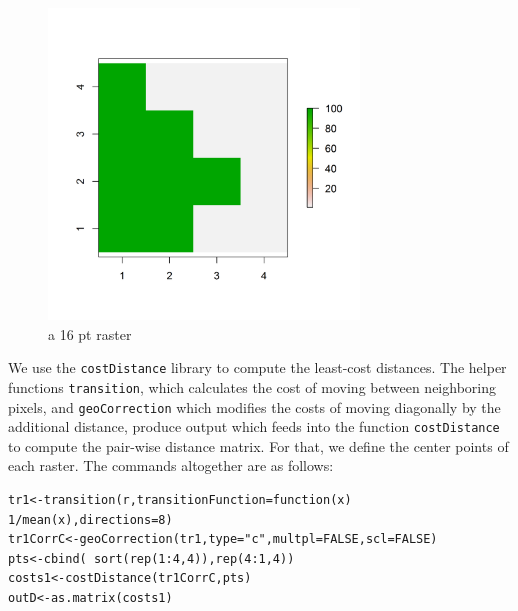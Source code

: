 \documentclass[12pt]{article}
\begin{document}
\begin{figure}
\begin{center}
\includegraphics[height=3.25in,width=3.25in]{figs/raster_2values}
\end{center}
\caption{a 16 pt raster}
\label{ecoldist.fig.raster}
\end{figure}

We use the \mbox{\tt costDistance} library to compute the least-cost
distances.  The helper functions \mbox{\tt transition}, which
calculates the cost of moving between neighboring pixels, and
\mbox{\tt geoCorrection} which modifies the costs of moving diagonally
by the additional distance, produce output which feeds into the
function \mbox{\tt costDistance} to compute the pair-wise distance
matrix. For that, we define the center points of each raster.  The
commands altogether are as follows:

\begin{verbatim}
tr1<-transition(r,transitionFunction=function(x) 1/mean(x),directions=8)
tr1CorrC<-geoCorrection(tr1,type="c",multpl=FALSE,scl=FALSE)
pts<-cbind( sort(rep(1:4,4)),rep(4:1,4))
costs1<-costDistance(tr1CorrC,pts)
outD<-as.matrix(costs1)
\end{verbatim}

\end{document}
